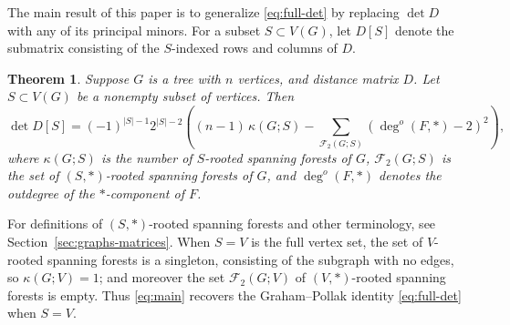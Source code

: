 \documentclass{amsart}
\newtheorem{thm}{Theorem}[section]
\theoremstyle{definition}
\newcommand{\forests}{\mathcal{F}}
\newcommand{\degout}{\deg^o}
\begin{document}
The main result of this paper is to generalize \eqref{eq:full-det} by replacing $\det D$ with any of its principal minors.
For a subset $S \subset V(G)$, let $D[S]$ denote the submatrix consisting of the $S$-indexed rows and columns of $D$.
\begin{thm}
\label{thm:main}
Suppose $G$ is a tree with $n$ vertices, 
and distance matrix $D$.
Let $S \subset V(G)$ be a nonempty subset of vertices.
Then
\begin{equation}\label{eq:main}
\det D[S] = (-1)^{|S|-1} 2^{|S|-2} \left( (n-1)\, \kappa(G;S)  - \sum_{\mathcal F_2(G;S)} \left(\degout(F,*) - 2\right)^2  \right),
\end{equation}
where 
$\kappa(G;S)$ is the number of $S$-rooted spanning forests of $G$,
$\forests_2(G;S)$ is the set of $(S,*)$-rooted spanning forests of $G$,
and
$\degout(F,*)$ denotes the outdegree of the $*$-component of $F$.
\end{thm}
For definitions of $(S,*)$-rooted spanning forests and other terminology, see Section~\ref{sec:graphs-matrices}.
When $S = V$ is the full vertex set, the set of $V$-rooted spanning forests is a singleton, consisting of the subgraph with no edges, 
so $\kappa(G; V) = 1$; and moreover the set $\forests_2(G; V)$ of $(V, *)$-rooted spanning forests is empty. 
Thus \eqref{eq:main} recovers the Graham--Pollak identity \eqref{eq:full-det} when $S = V$.
\end{document}
